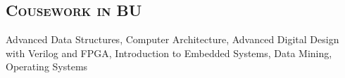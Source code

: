 \begin{resume}
	
	\section{\textsc{Cousework in BU}}
	
	Advanced Data Structures, Computer Architecture, Advanced Digital Design with
	Verilog and FPGA, Introduction to Embedded Systems, Data Mining, Operating
  Systems 
	
	
	
	
	
	
	
	
	
	
	
	
	
	
	
	
\end{resume}


